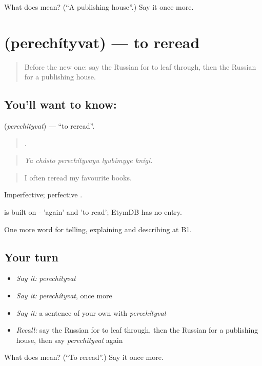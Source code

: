 \begin{tcolorbox}[breakable,colback=teal!4,colframe=teal!35!black,title={Before you move on}]
What does  mean? (\textquotedblleft{}A publishing house\textquotedblright{}.) Say it once more.
\end{tcolorbox}
\section[\texorpdfstring{\ru{перечитывать} (perechítyvat)}{перечитывать (perechítyvat)}]{ (perechítyvat) — to reread}

\label{lesson:RU-C526-perechityvat}



\begin{quote}
Before the new one: say the Russian for to leaf through, then the Russian for a publishing house.
\end{quote}

\subsection*{You'll want to know: }
\textbf{} (\emph{perechítyvat}) — \textquotedblleft{}to reread\textquotedblright{}.

\begin{quote}
    .
\end{quote}

\begin{quote}
\emph{Ya chásto perechítyvayu lyubímyye knígi.}
\end{quote}

\begin{quote}
I often reread my favourite books.
\end{quote}

Imperfective; perfective .

\begin{cousinweb}
\emph{} is built on \emph{-} 'again' and \emph{} 'to read'; EtymDB has no entry.
\end{cousinweb}

\begin{grammarlens}[title={What you've built}]
One more word for telling, explaining and describing at B1.
\end{grammarlens}

\subsection*{Your turn}
\begin{itemize}
\raggedright
  \item \emph{Say it:} \emph{perechítyvat}
  \item \emph{Say it:} \emph{perechítyvat}, once more
  \item \emph{Say it:} a sentence of your own with \emph{perechítyvat}
  \item \emph{Recall:} say the Russian for to leaf through, then the Russian for a publishing house, then say \emph{perechítyvat} again
\end{itemize}

\begin{tcolorbox}[breakable,colback=teal!4,colframe=teal!35!black,title={Before you move on}]
What does  mean? (\textquotedblleft{}To reread\textquotedblright{}.) Say it once more.
\end{tcolorbox}
